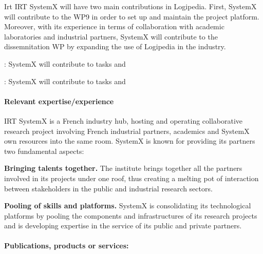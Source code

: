 \begin{sitedescription}{Irt}
IRT SystemX will have two main contributions in Logipedia. First, SystemX will contribute to the WP9 in order to set up and maintain the project platform. Moreover, with its experience in terms of collaboration with academic laboratories and industrial partners, SystemX will contribute to the dissemnitation WP by expanding the use of Logipedia in the industry.






\begin{compactitem}
\item {}: SystemX will contribute to tasks  and 
\item {}: SystemX will contribute to tasks  and 
\end{compactitem}




\paragraph{Relevant expertise/experience}

IRT SystemX is a French industry hub, hosting and operating collaborative research project involving French industrial partners, academics and SystemX own resources into the same room. SystemX is known for providing its partners two fundamental aspects:

\begin{compactitem}
\item {\bf Bringing talents together.} The institute brings together all the partners involved in its projects under one roof, thus creating a melting pot of interaction between stakeholders in the public and industrial research sectors.
\item {\bf Pooling of skills and platforms.} SystemX is consolidating its technological platforms by pooling the components and infrastructures of its research projects and is developing expertise in the service of its public and private partners.
\end{compactitem}




\paragraph{Publications, products or services:}


\end{sitedescription}
